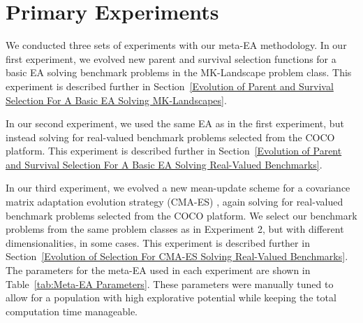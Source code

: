 \documentclass[sigconf]{acmart}
\begin{document}
\section{Primary Experiments}
\label{Primary Experiments}

We conducted three sets of experiments with our meta-EA methodology. In our first experiment, we evolved new parent and survival selection functions for a basic EA solving benchmark problems in the MK-Landscape problem class. This experiment is described further in Section~\ref{Evolution of Parent and Survival Selection For A Basic EA Solving MK-Landscapes}.

In our second experiment, we used the same EA as in the first experiment, but instead solving for real-valued benchmark problems selected from the COCO platform. This experiment is described further in Section~\ref{Evolution of Parent and Survival Selection For A Basic EA Solving Real-Valued Benchmarks}.

In our third experiment, we evolved a new mean-update scheme for a covariance matrix adaptation evolution strategy (CMA-ES) \citep{hansen1996cmaes}, again solving for real-valued benchmark problems selected from the COCO platform. We select our benchmark problems from the same problem classes as in Experiment 2, but with different dimensionalities, in some cases. This experiment is described further in Section~\ref{Evolution of Selection For CMA-ES Solving Real-Valued Benchmarks}.
The parameters for the meta-EA used in each experiment are shown in Table~\ref{tab:Meta-EA Parameters}. These parameters were manually tuned to allow for a population with high explorative potential while keeping the total computation time manageable.
\end{document}
